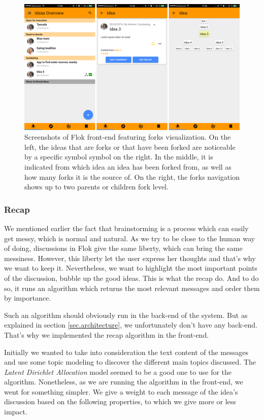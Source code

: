 \documentclass[a4paper,12pt, oneside]{article}
\begin{document}
\begin{figure}[!htb]
\centering
\includegraphics[width=\textwidth]{images/forks.png}
\caption{Screenshots of Flok front-end featuring forks visualization. On the left, the ideas that are forks or that have been forked are noticeable by a specific symbol symbol on the right. In the middle, it is indicated from which idea an idea has been forked from, as well as how many forks it is the source of. On the right, the forks navigation shows up to two parents or children fork level.}
\label{fig.forks}
\end{figure}

\subsubsection{Recap}
\label{sec.recap}
We mentioned earlier the fact that brainstorming is a process which can easily get messy, which is normal and natural.
As we try to be close to the human way of doing, discussions in Flok give the same liberty, which can bring the same messiness.
However, this liberty let the user express her thoughts and that's why we want to keep it.
Nevertheless, we want to highlight the most important points of the discussion, bubble up the good ideas.
This is what the recap do.
And to do so, it runs an algorithm which returns the most relevant messages and order them by importance.

Such an algorithm should obviously run in the back-end of the system.
But as explained in section \ref{sec.architecture}, we unfortunately don't have any back-end.
That's why we implemented the recap algorithm in the front-end.

Initially we wanted to take into consideration the text content of the messages and use some topic modeling to discover the different main topics discussed.
The \emph{Latent Dirichlet Allocation} \cite{blei2003latent} model seemed to be a good one to use for the algorithm.
Nonetheless, as we are running the algorithm in the front-end, we went for something simpler.
We give a weight to each message of the idea's discussion based on the following properties, to which we give more or less impact.
\end{document}
